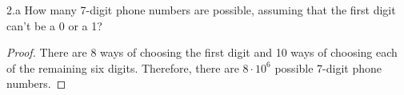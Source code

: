 \begin{exercise}{2.a}
    How many 7-digit phone numbers are possible, assuming that the first digit can’t be a 0 or a 1?
\end{exercise}

\begin{proof}
    There are 8 ways of choosing the first digit and 10 ways of choosing each of the remaining six digits. Therefore, there are $8 \cdot 10^6$ possible 7-digit phone numbers.
\end{proof}


